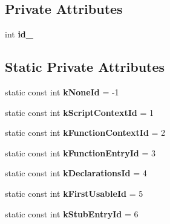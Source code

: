 \subsection*{Private Attributes}
\begin{DoxyCompactItemize}
\item 
int {\bfseries id\+\_\+}\hypertarget{classv8_1_1internal_1_1_bailout_id_a584552353e825d6052c44044e1cbf5f1}{}\label{classv8_1_1internal_1_1_bailout_id_a584552353e825d6052c44044e1cbf5f1}

\end{DoxyCompactItemize}
\subsection*{Static Private Attributes}
\begin{DoxyCompactItemize}
\item 
static const int {\bfseries k\+None\+Id} = -\/1\hypertarget{classv8_1_1internal_1_1_bailout_id_a71055cead921b83951d24c45abe36a89}{}\label{classv8_1_1internal_1_1_bailout_id_a71055cead921b83951d24c45abe36a89}

\item 
static const int {\bfseries k\+Script\+Context\+Id} = 1\hypertarget{classv8_1_1internal_1_1_bailout_id_a125445186199b4071a5555268e9afce6}{}\label{classv8_1_1internal_1_1_bailout_id_a125445186199b4071a5555268e9afce6}

\item 
static const int {\bfseries k\+Function\+Context\+Id} = 2\hypertarget{classv8_1_1internal_1_1_bailout_id_aeb118a5da7b632729c23af688da4b7b6}{}\label{classv8_1_1internal_1_1_bailout_id_aeb118a5da7b632729c23af688da4b7b6}

\item 
static const int {\bfseries k\+Function\+Entry\+Id} = 3\hypertarget{classv8_1_1internal_1_1_bailout_id_ac9d71bf0b46ba2834a49896fbab05d3d}{}\label{classv8_1_1internal_1_1_bailout_id_ac9d71bf0b46ba2834a49896fbab05d3d}

\item 
static const int {\bfseries k\+Declarations\+Id} = 4\hypertarget{classv8_1_1internal_1_1_bailout_id_a16be2c91c750c9e227c0062c7884eee2}{}\label{classv8_1_1internal_1_1_bailout_id_a16be2c91c750c9e227c0062c7884eee2}

\item 
static const int {\bfseries k\+First\+Usable\+Id} = 5\hypertarget{classv8_1_1internal_1_1_bailout_id_a0b340b615231fe65874d01a1a58e8076}{}\label{classv8_1_1internal_1_1_bailout_id_a0b340b615231fe65874d01a1a58e8076}

\item 
static const int {\bfseries k\+Stub\+Entry\+Id} = 6\hypertarget{classv8_1_1internal_1_1_bailout_id_a984bfbc1a6df7a51163b8b75d6611c57}{}\label{classv8_1_1internal_1_1_bailout_id_a984bfbc1a6df7a51163b8b75d6611c57}

\end{DoxyCompactItemize}
